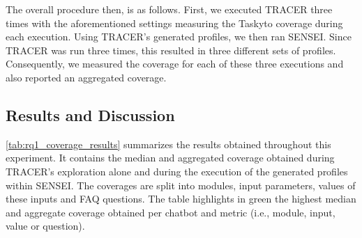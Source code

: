 The overall procedure then, is as follows.
First, we executed TRACER three times with the aforementioned settings
measuring the Taskyto coverage during each execution.
Using TRACER's generated profiles, we then ran SENSEI.
Since TRACER was run three times,
this resulted in three different sets of profiles.
Consequently, we measured the coverage for each of these three executions
and also reported an aggregated coverage.



\subsection{Results and Discussion}

\autoref{tab:rq1_coverage_results}
summarizes the results obtained throughout this experiment.
It contains the median and aggregated coverage obtained
during TRACER's exploration alone
and during the execution of the generated profiles within SENSEI.
The coverages are split into
modules, input parameters, values of these inputs and FAQ questions.
The table highlights in green the highest median and aggregate coverage
obtained per chatbot and metric
(i.e., module, input, value or question).

